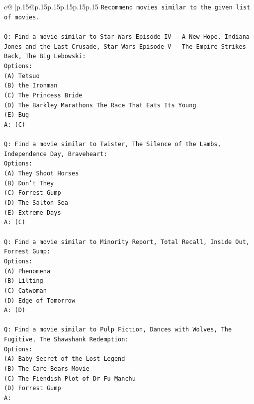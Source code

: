 \documentclass{article}
\begin{document}
{\begin{supertabular}{c@{$\;$}|p{.15\linewidth}@{}p{.15\linewidth}p{.15\linewidth}p{.15\linewidth}p{.15\linewidth}p{.15\linewidth}}
{{{\texttt{Recommend movies similar to the given list of movies.} \\
\\ 
\texttt{Q: Find a movie similar to Star Wars Episode IV {-} A New Hope, Indiana Jones and the Last Crusade, Star Wars Episode V {-} The Empire Strikes Back, The Big Lebowski:} \\
\texttt{Options:} \\
\texttt{(A) Tetsuo} \\
\texttt{(B) the Ironman} \\
\texttt{(C) The Princess Bride} \\
\texttt{(D) The Barkley Marathons The Race That Eats Its Young} \\
\texttt{(E) Bug} \\
\texttt{A: (C)} \\
\\ 
\texttt{Q: Find a movie similar to Twister, The Silence of the Lambs, Independence Day, Braveheart:} \\
\texttt{Options:} \\
\texttt{(A) They Shoot Horses} \\
\texttt{(B) Don't They} \\
\texttt{(C) Forrest Gump} \\
\texttt{(D) The Salton Sea} \\
\texttt{(E) Extreme Days} \\
\texttt{A: (C)} \\
\\ 
\texttt{Q: Find a movie similar to Minority Report, Total Recall, Inside Out, Forrest Gump:} \\
\texttt{Options:} \\
\texttt{(A) Phenomena} \\
\texttt{(B) Lilting} \\
\texttt{(C) Catwoman} \\
\texttt{(D) Edge of Tomorrow} \\
\texttt{A: (D)} \\
\\ 
\texttt{Q: Find a movie similar to Pulp Fiction, Dances with Wolves, The Fugitive, The Shawshank Redemption:} \\
\texttt{Options:} \\
\texttt{(A) Baby Secret of the Lost Legend} \\
\texttt{(B) The Care Bears Movie} \\
\texttt{(C) The Fiendish Plot of Dr Fu Manchu} \\
\texttt{(D) Forrest Gump} \\
\texttt{A:} \\
            }
        }
    }
     \\ \\


\end{supertabular}}
\end{document}

